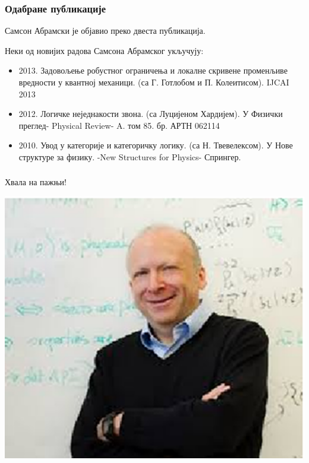 \documentclass{beamer}
\begin{document}
\begin{frame}
\frametitle{Одабране публикације}
Самсон Абрамски је објавио преко двеста публикација.

Неки од новијих радова Самсона Абрамског укључују: 

\begin{itemize}

\item    2013. Задовољење робустног ограничења и локалне скривене променљиве вредности у квантној механици. (са Г. Готлобом и П. Колеитисом). IJCAI 2013
\item    2012. Логичке неједнакости звона. (са Луцијеном Хардијем). У Физички преглед-{ Physical Review}- A. том 85. бр. АРТН 062114
\item    2010. Увод у категорије и категоричку логику. (са Н. Твевелексом). У Нове структуре за физику. -{New Structures for Physics}- Спрингер.

\end{itemize}
\end{frame}

\begin{frame}
\frametitle{}
\begin{center}
Хвала на пажњи!
\end{center}
\begin{center}
\includegraphics[scale=0.5]{index.eps}
\end{center}
\end{frame}
\end{document}
